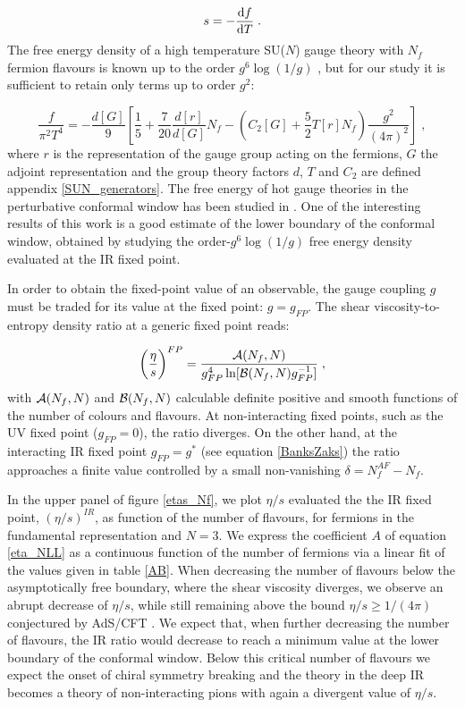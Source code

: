 \begin{equation}
s = - \frac{\mathrm{d} f}{\mathrm{d} T}  \; . 
\end{equation}
%
The free energy density of a high temperature SU($N$) gauge theory with $N_f$ fermion flavours is known up to the order $g^6 \log(1/g)$ \cite{Kajantie:2002wa}, but for our study it is sufficient to retain only terms up to order $g^2$:

\begin{equation}
\frac{f}{\pi^2 T^4 } = - \frac{d[G]}{9} \left[ \frac{1}{5} + \frac{7}{20}\frac{d[r]}{d[G]}N_f 
-   \left ( C_2[G] + \frac{5}{2}T[r] N_f \right ) \frac{g^2}{(4\pi)^2} \right ]\; ,
\end{equation}
%
where $r$ is the representation of the gauge group acting on the fermions, $G$ the adjoint representation and the group theory factors $d$, $T$ and $C_2$ are defined appendix \ref{SUN_generators}.
The free energy of hot gauge theories in the perturbative conformal window has been studied in \cite{Mojaza:2010cm}. One of the interesting results of this work is a good estimate of the lower boundary of the conformal window, obtained by studying the order-$g^6 \log(1/g)$ free energy density evaluated at the IR fixed point.

In order to obtain the fixed-point value of an observable, the gauge coupling $g$ must be traded for its value at the fixed point: $g=g_{FP}$. The shear viscosity-to-entropy density ratio at a generic fixed point reads:


\begin{equation}
\biggl( \frac{\eta}{s} \biggr)^{FP} = \frac{{\cal A}(N_ f, N) }{g_{FP}^4 \ln[{\cal B}(N_f, N)g_{FP}^{-1}]}  \; , 
\label{etaoversFP}
\end{equation}
%
with $ {\cal A}(N_f, N) $  and $ {\cal B}(N_f, N) $ calculable definite positive and smooth functions of the number of 
colours and flavours.  At non-interacting fixed points,  such as the UV fixed point ($g_{FP} = 0$), the ratio diverges. On the  other hand, at the interacting IR fixed point $g_{FP} = g^*$ (see equation \ref{BanksZaks}) the ratio approaches a finite value controlled by a small non-vanishing $\delta = N_f^{AF} - N_f $. 
 
In the upper panel of figure \ref{etas_Nf}, we plot $\eta/s$ evaluated the the IR fixed point, $(\eta/s)^{IR}$, as function of the number of flavours, for fermions in the fundamental representation and $N = 3$. We express the coefficient $A$ of equation \ref{eta_NLL} as a continuous function of the number of fermions via a linear fit of the values given in table \ref{AB}. When decreasing the number of flavours below the asymptotically free boundary, where the shear viscosity diverges, we observe an abrupt decrease of $\eta/s$, while still remaining above the bound $\eta/s \geq 1/(4\pi)$ conjectured by AdS/CFT \cite{Kovtun:2004de}. We expect that, when further decreasing the number of flavours, the IR ratio would decrease to reach a minimum value at the lower boundary of the conformal window. Below this critical number of flavours we expect the onset of chiral symmetry breaking and the theory in the deep IR becomes a theory of non-interacting pions with again a divergent value of $\eta/s$.

